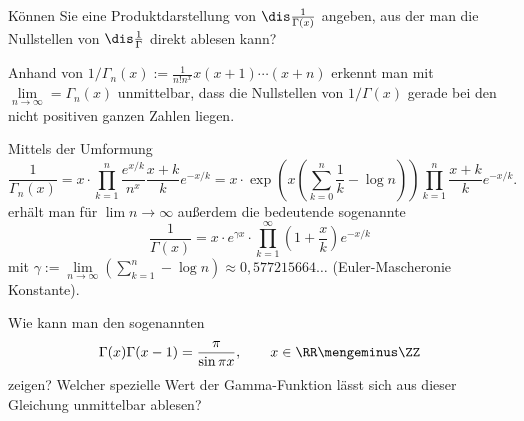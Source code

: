   \begin{frage}
    Können Sie eine Produktdarstellung von $\dis \frac{1}{\Gamma(x)}$ angeben, 
    aus der man die Nullstellen von $\dis \frac{1}{\Gamma}$ 
    direkt ablesen kann?
  \end{frage}



  \begin{antwort}
    Anhand von
    $1/\Gamma_n(x) := \frac{1}{n!n^x} x(x+1)\cdots (x+n)$ 
    erkennt man mit $\lim\limits_{n\to\infty} = \Gamma_n(x)$ 
    unmittelbar, dass die Nullstellen von $1/\Gamma(x)$ 
    gerade bei den nicht positiven ganzen Zahlen liegen. 

    \noindent
    Mittels der Umformung 
    \[
    \frac{1}{\Gamma_n (x)} =  
    x \cdot \prod_{k=1}^n \frac{e^{x/k}}{n^x}\frac{x+k}{k} e^{-x/k} =
    x \cdot \exp\left( x \left( \sum_{k=0}^n \frac{1}{k} - \log n \right) \right) 
    \prod_{k=1}^n \frac{x+k}{k} e^{-x/k}.
    \]
    erhält man für $\lim n\to \infty$ außerdem die bedeutende 
    sogenannte 
    \[
    \boxed{
      \frac{1}{\Gamma(x)} = x\cdot e^{\gamma x } \cdot \prod_{k=1}^\infty 
      \left( 1+ \frac{x}{k} \right) e^{-x/k} 
    }
    \]
    mit $\gamma:= 
    \lim\limits_{n\to\infty} \left( \sum_{k=1}^n - \log n \right)
    \approx 0,577215664\ldots$ (Euler-Mascheroni\sch e Konstante).
    \AntEnd
  \end{antwort} 


  \begin{frage}
    Wie kann man den sogenannten  
    \[
    \Gamma(x) \Gamma(x-1) = \frac{\pi}{\sin \pi x }, 
    \qquad x\in \RR \mengeminus \ZZ
    \]
    zeigen? 
    Welcher spezielle Wert der Gamma-Funktion lässt sich aus 
    dieser Gleichung unmittelbar ablesen?
  \end{frage}

